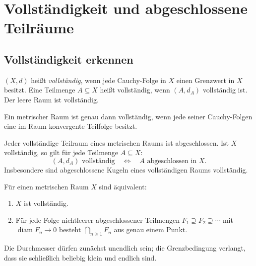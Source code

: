\chapter{Vollständigkeit und abgeschlossene Teilräume}
\label{b47guide:ch:completeness}

\section{Vollständigkeit erkennen}

\begin{definition}[Vollständigkeit]
\label{b47guide:def:complete}
$(X,d)$ heißt \emph{vollständig}, wenn jede Cauchy-Folge in $X$ einen
Grenzwert in $X$ besitzt. Eine Teilmenge $A\subseteq X$ heißt vollständig,
wenn $(A,d_A)$ vollständig ist. Der leere Raum ist vollständig.
\end{definition}

\begin{theorem}
Ein metrischer Raum ist genau dann vollständig, wenn jede seiner
Cauchy-Folgen eine im Raum konvergente Teilfolge besitzt.
\end{theorem}

\begin{theorem}
\label{b47guide:thm:closed-complete}
Jeder vollständige Teilraum eines metrischen Raums ist abgeschlossen.
Ist $X$ vollständig, so gilt für jede Teilmenge $A\subseteq X$:
\[
 (A,d_A)\text{ vollständig}\quad\Longleftrightarrow\quad
 A\text{ abgeschlossen in }X.
\]
Insbesondere sind abgeschlossene Kugeln eines vollständigen Raums
vollständig. \cite{project,metric-notes}
\end{theorem}

\begin{theorem}
\label{b47guide:thm:cantor}
Für einen metrischen Raum $X$ sind äquivalent:
\begin{enumerate}
\item $X$ ist vollständig.
\item Für jede Folge nichtleerer abgeschlossener Teilmengen
$F_1\supseteq F_2\supseteq\cdots$ mit
$\operatorname{diam}F_n\to0$ besteht $\bigcap_{n\geq1}F_n$ aus genau einem
Punkt.
\end{enumerate}
Die Durchmesser dürfen zunächst unendlich sein; die Grenzbedingung
verlangt, dass sie schließlich beliebig klein und endlich sind.
\cite{baire-notes}
\end{theorem}

